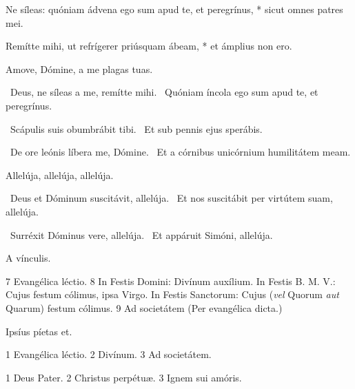 Ne síleas: quóniam ádvena ego sum apud te, et peregrínus, * sicut omnes patres mei.

Remítte mihi, ut refrígerer priúsquam ábeam, * et ámplius non ero.



 Amove, Dómine, a me plagas tuas.


\V\ Deus, ne síleas a me, remítte mihi. \R\ Quóniam íncola ego sum apud te, et peregrínus.


\V\ Scápulis suis obumbrábit tibi. \R\ Et sub pennis ejus sperábis.


\V\ De ore leónis líbera me, Dómine. \R\ Et a córnibus unicórnium humilitátem meam.


 Allelúja, allelúja, allelúja.


\V\ Deus et Dóminum suscitávit, allelúja. \R\ Et nos suscitábit per virtútem suam, allelúja.


\V\ Surréxit Dóminus vere, allelúja. \R\ Et appáruit Simóni, allelúja.


 A vínculis.

 7 Evangélica léctio. 8 In Festis Domini: Divínum auxílium. In Festis B. M. V.: Cujus festum cólimus, ipsa Virgo. In Festis Sanctorum: Cujus (\textit{vel} Quorum \textit{aut} Quarum) festum cólimus. 9 Ad societátem (Per evangélica dicta.)


 Ipsíus píetas et.


 1 Evangélica léctio. 2 Divínum. 3 Ad societátem.


 1 Deus Pater. 2 Christus perpétuæ. 3 Ignem sui amóris.


